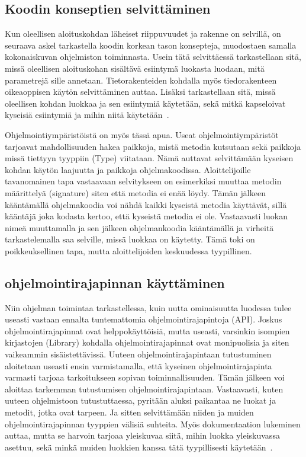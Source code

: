 \documentclass[finnish]{../tktltiki2}
\theoremstyle{definition}
\theoremstyle{remark}
\begin{document}
\subsection{Koodin konseptien selvittäminen}
Kun oleellisen aloituskohdan läheiset riippuvuudet ja rakenne on selvillä, on seuraava askel tarkastella koodin korkean tason konsepteja, muodostaen samalla kokonaiskuvan ohjelmiston toiminnasta. Usein tätä selvittäessä tarkastellaan sitä, missä oleellisen aloituskohan sisältävä esiintymä luokasta luodaan, mitä parametrejä sille annetaan. Tietorakenteiden kohdalla myös tiedorakenteen oikeaoppisen käytön selvittäminen auttaa. Lisäksi tarkastellaan sitä, missä oleellisen kohdan luokkaa ja sen esiintymiä käytetään, sekä mitkä kapseloivat kyseisiä esiintymiä ja mihin niitä käytetään~\cite{questions-during-software-evolution-tasks,eliciting-design-requirements-for-maintenance-oriented-ides}.

Ohjelmointiympäristöistä on myös tässä apua. Useat ohjelmointiympäristöt tarjoavat mahdollisuuden hakea paikkoja, mistä metodia kutsutaan sekä paikkoja missä tiettyyn tyyppiin (Type) viitataan. Nämä auttavat selvittämään kyseisen kohdan käytön laajuutta ja paikkoja ohjelmakoodissa. Aloittelijoille tavanomainen tapa vastaavaan selvitykseen on esimerkiksi muuttaa metodin määrittelyä (signature) siten että metodia ei enää löydy. Tämän jälkeen kääntämällä ohjelmakoodia voi nähdä kaikki kyseistä metodia käyttävät, sillä kääntäjä joka kodasta kertoo, että kyseistä metodia ei ole. Vastaavasti luokan nimeä muuttamalla ja sen jälkeen ohjelmankoodia kääntämällä ja virheitä tarkastelemalla saa selville, missä luokkaa on käytetty. Tämä toki on poikkeuksellinen tapa, mutta aloittelijoiden keskuudessa tyypillinen.

\subsection{ohjelmointirajapinnan käyttäminen}
Niin ohjelman toimintaa tarkastellessa, kuin uutta ominaisuutta luodessa tulee useasti vastaan ennalta tuntemattomia ohjelmointirajapintoja (API). Joskus ohjelmointirajapinnat ovat helppokäyttöisiä, mutta useasti, varsinkin isompien kirjastojen (Library) kohdalla ohjelmointirajapinnat ovat monipuolisia ja siten vaikeammin sisäistettävissä.
Uuteen ohjelmointirajapintaan tutustuminen aloitetaan useasti ensin varmistamalla, että kyseinen ohjelmointirajapinta varmasti tarjoaa tarkoitukseen sopivan toiminnallisuuden. Tämän jälkeen voi aloittaa tarkemman tutustumisen ohjelmointirajapintaan.
Vastaavasti, kuten uuteen ohjelmistoon tutustuttaessa, pyritään aluksi paikantaa ne luokat ja metodit, jotka ovat tarpeen. Ja sitten selvittämään niiden ja muiden ohjelmointirajapinnan tyyppien välisiä suhteita. Myös dokumentaation lukeminen auttaa, mutta se harvoin tarjoaa yleiskuvaa siitä, mihin luokka yleiskuvassa asettuu, sekä minkä muiden luokkien kanssa tätä tyypillisesti käytetään~\cite{asking-and-answering-api-questions}.
\end{document}
